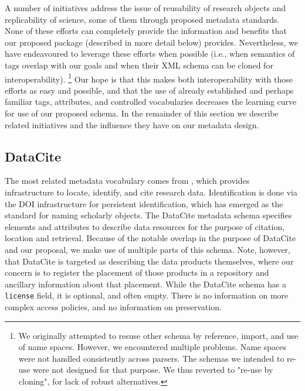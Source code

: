 

A number of  initiatives address the issue of reusability of research objects and replicability of science, some of them through proposed metadata standards. None of these efforts can completely provide the information and benefits that our proposed  \metajelo package (described in more detail below) provides. Nevertheless, we have endeavoured to leverage these efforts when possible (i.e., when semantics of tags overlap with our goals and when their XML schema can be cloned for interoperability).%
\footnote{We originally attempted to resuse other schema by reference, import, and use of name spaces. However, we encountered multiple problems. Name spaces were not handled consistently across parsers. The schemas we intended to re-use were not designed for that purpose. We thus reverted to "re-use by cloning", for lack of robust alternatives.} 
Our hope is that this makes both interoperability with those efforts as easy and possible, and that the use of already established and perhaps familiar tags, attributes, and controlled vocabularies decreases the learning curve for use of our proposed schema.  In the remainder of this section we describe related initiatives and the influence they have on our metadata design.

\subsection{DataCite}
The most related metadata vocabulary comes from , which provides infrastructure to locate, identify, and cite research data. Identification is done via the DOI infrastructure for persistent identification, which has emerged as the standard for naming scholarly objects.  The DataCite metadata schema \parencite{DataCiteMetadataWorkingGroup2017a,DataCiteMetadataWorkingGroup2017} specifies elements and attributes to describe data resources for the purpose of citation, location and retrieval.  Because of the notable overlap in the purpose of DataCite  and our proposal, we make use of multiple parts of this schema. Note, however, that DataCite is targeted as describing the data products themselves, where our concern is to register the placement of those products in a repository and ancillary information about that placement. While the DataCite schema has a \texttt{license} field, it is optional, and  often empty. There is no information on more complex access policies, and no information on preservation.

